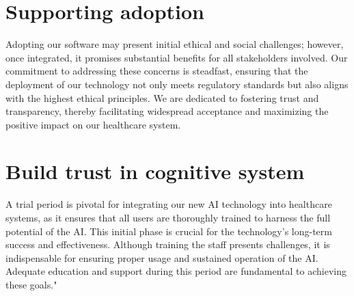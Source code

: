 \documentclass{article}
\begin{document}
\section{Supporting adoption}
Adopting our software may present initial ethical and social challenges; however, once integrated, it promises substantial benefits for all stakeholders involved. Our commitment to addressing these concerns is steadfast, ensuring that the deployment of our technology not only meets regulatory standards but also aligns with the highest ethical principles. We are dedicated to fostering trust and transparency, thereby facilitating widespread acceptance and maximizing the positive impact on our healthcare system.

\section{Build trust in cognitive system}
A trial period is pivotal for integrating our new AI technology into healthcare systems, as it ensures that all users are thoroughly trained to harness the full potential of the AI. This initial phase is crucial for the technology’s long-term success and effectiveness. Although training the staff presents challenges, it is indispensable for ensuring proper usage and sustained operation of the AI. Adequate education and support during this period are fundamental to achieving these goals."
\end{document}

